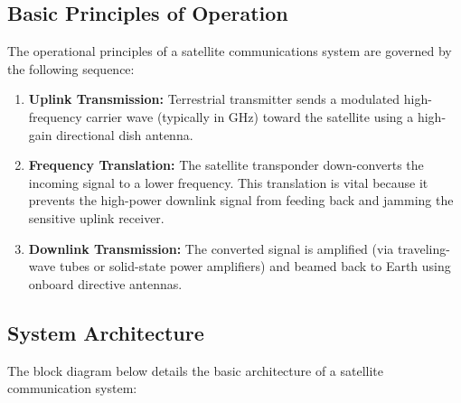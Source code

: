 \documentclass[12pt,a4paper]{article}
\begin{document}
\subsection{Basic Principles of Operation}
The operational principles of a satellite communications system are governed by the following sequence:
\begin{enumerate}[label=\textbf{\arabic*.}, leftmargin=*, itemsep=3pt]
  \item \textbf{Uplink Transmission:} Terrestrial transmitter sends a modulated high-frequency carrier wave (typically in GHz) toward the satellite using a high-gain directional dish antenna.
  \item \textbf{Frequency Translation:} The satellite transponder down-converts the incoming signal to a lower frequency. This translation is vital because it prevents the high-power downlink signal from feeding back and jamming the sensitive uplink receiver.
  \item \textbf{Downlink Transmission:} The converted signal is amplified (via traveling-wave tubes or solid-state power amplifiers) and beamed back to Earth using onboard directive antennas.
\end{enumerate}

\subsection{System Architecture}
The block diagram below details the basic architecture of a satellite communication system:

\begin{tcolorbox}[tikzbox, title={Satellite Communication System Architecture}]
\centering
{}
\end{tcolorbox}
\end{document}
